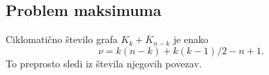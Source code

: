 \documentclass[fin1, tisk]{fmfdelo}
\newcommand{\KC}{\overline{K}}
\newcommand{\cM}{\operatorname{cM}_2}
\begin{document}





\subsection{Problem maksimuma}

\begin{opomba}
  Ciklomatično število grafa $K_k + \KC_{n-k}$ je enako 
  \[\nu = k (n-k) + k (k-1) / 2 - n + 1.\] To preprosto sledi iz števila 
  njegovih povezav. 
\end{opomba}
\end{document}
